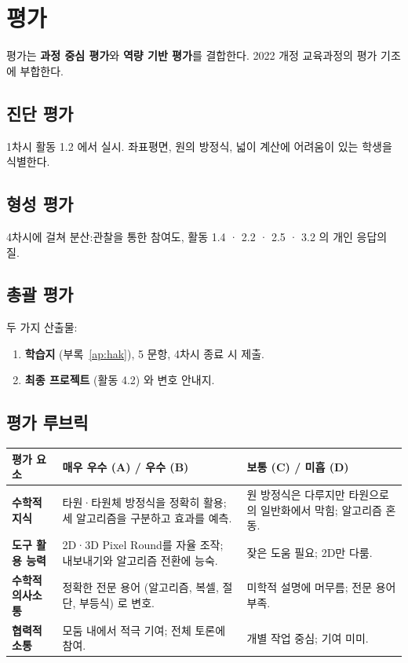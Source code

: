 \documentclass[12pt,a4paper]{scrartcl}
\newcommand{\acc}[1]{\textcolor{accent}{\textbf{#1}}}
\begin{document}
\section{평가}

평가는 \acc{과정 중심 평가}와 \acc{역량 기반 평가}를 결합한다. 2022 개정 교육과정의 평가 기조에 부합한다.

\subsection{진단 평가}
1차시 활동 1.2 에서 실시. 좌표평면, 원의 방정식, 넓이 계산에 어려움이 있는 학생을 식별한다.

\subsection{형성 평가}
4차시에 걸쳐 분산:관찰을 통한 참여도, 활동 1.4 · 2.2 · 2.5 · 3.2 의 개인 응답의 질.

\subsection{총괄 평가}
두 가지 산출물:
\begin{enumerate}[leftmargin=1.5em,itemsep=0.2em,topsep=0.3em,nosep]
  \item \textbf{학습지} (부록~\ref{ap:hak}), 5 문항, 4차시 종료 시 제출.
  \item \textbf{최종 프로젝트} (활동 4.2) 와 변호 안내지.
\end{enumerate}

\subsection{평가 루브릭}

\begin{center}
\small
\begin{tabularx}{\textwidth}{@{}p{}XX@{}}
\toprule
\textbf{평가 요소} & \textbf{매우 우수 (A) / 우수 (B)} & \textbf{보통 (C) / 미흡 (D)} \\
\midrule
\textbf{수학적 지식} & 타원·타원체 방정식을 정확히 활용; 세 알고리즘을 구분하고 효과를 예측. & 원 방정식은 다루지만 타원으로의 일반화에서 막힘; 알고리즘 혼동. \\
\addlinespace[3pt]
\textbf{도구 활용 능력} & 2D·3D Pixel Round를 자율 조작; 내보내기와 알고리즘 전환에 능숙. & 잦은 도움 필요; 2D만 다룸. \\
\addlinespace[3pt]
\textbf{수학적 의사소통} & 정확한 전문 용어 (알고리즘, 복셀, 절단, 부등식) 로 변호. & 미학적 설명에 머무름; 전문 용어 부족. \\
\addlinespace[3pt]
\textbf{협력적 소통} & 모둠 내에서 적극 기여; 전체 토론에 참여. & 개별 작업 중심; 기여 미미. \\
\bottomrule
\end{tabularx}
\end{center}
\end{document}
